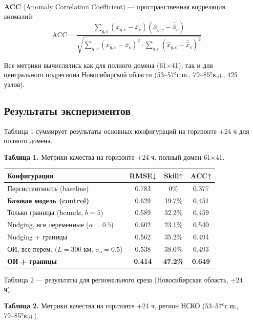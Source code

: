 \documentclass[14pt,a4paper]{extarticle}
\newcounter{none}
\numberwithin{table}{section}
\numberwithin{figure}{section}
\numberwithin{equation}{section}
\begin{document}
\textbf{ACC} (Anomaly Correlation Coefficient) --- пространственная
корреляция аномалий:
\[\text{ACC} = \frac{\sum_{g,c} (x_{g,c} - \bar{x}_c)(\hat{x}_{g,c} - \bar{\hat{x}}_c)}{\sqrt{\sum_{g,c}(x_{g,c}-\bar{x}_c)^2 \cdot \sum_{g,c}(\hat{x}_{g,c}-\bar{\hat{x}}_c)^2}}\]

Все метрики вычислялись как для полного домена (61×41), так и для
центрального подрегиона Новосибирской области (53--57°с.ш., 79--85°в.д.,
425 узлов).

\subsection{Результаты экспериментов}\label{ux440ux435ux437ux443ux43bux44cux442ux430ux442ux44b-ux44dux43aux441ux43fux435ux440ux438ux43cux435ux43dux442ux43eux432}

Таблица 1 суммирует результаты основных конфигураций на горизонте +24 ч
для полного домена.

\textbf{Таблица 1.} Метрики качества на горизонте +24 ч, полный домен
61×41.

{\def\LTcaptype{none} %
\begin{longtable}[]{@{}lccc@{}}
\toprule\noalign{}
Конфигурация & RMSE↓ & Skill↑ & ACC↑ \\
\midrule\noalign{}
\endhead
\bottomrule\noalign{}
\endlastfoot
Персистентность (baseline) & 0.783 & 0\% & 0.377 \\
\textbf{Базовая модель (control)} & 0.629 & 19.7\% & 0.451 \\
Только границы (bounds, \(b=5\)) & 0.589 & 32.2\% & 0.459 \\
Nudging, все переменные (\(\alpha=0.5\)) & 0.602 & 23.1\% & 0.540 \\
Nudging + границы & 0.562 & 35.2\% & 0.494 \\
ОИ, все перем. (\(L=300\) км, \(\sigma_o=0.5\)) & 0.538 & 38.0\% &
0.493 \\
\textbf{ОИ + границы} & \textbf{0.414} & \textbf{47.2\%} &
\textbf{0.649} \\
\end{longtable}
}

Таблица 2 --- результаты для регионального среза (Новосибирская область,
+24 ч).

\textbf{Таблица 2.} Метрики качества на горизонте +24 ч, регион НСКО
(53--57°с.ш., 79--85°в.д.).
\end{document}
